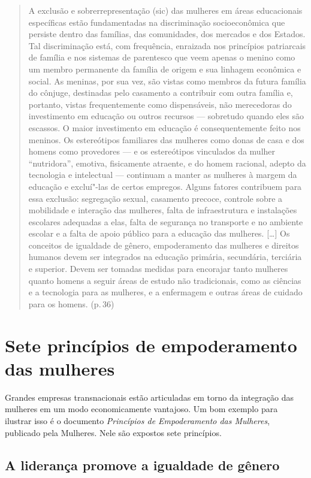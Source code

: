 \begin{quote}
A exclusão e sobrerrepresentação (sic) das mulheres em áreas
educacionais específicas estão fundamentadas na discriminação
socioeconômica que persiste dentro das famílias, das comunidades, dos
mercados e dos Estados. Tal discriminação está, com frequência,
enraizada nos princípios patriarcais de família e nos sistemas de
parentesco que veem apenas o menino como um membro permanente da família
de origem e sua linhagem econômica e social. As meninas, por sua vez,
são vistas como membros da futura família do cônjuge, destinadas pelo
casamento a contribuir com outra família e, portanto, vistas
frequentemente como dispensáveis, não merecedoras do investimento em
educação ou outros recursos --- sobretudo quando eles são escassos. O
maior investimento em educação é consequentemente feito nos meninos. Os
estereótipos familiares das mulheres como donas de casa e dos homens
como provedores --- e os estereótipos vinculados da mulher ``nutridora'',
emotiva, fisicamente atraente, e do homem racional, adepto da tecnologia
e intelectual --- continuam a manter as mulheres à margem da educação e
excluí"-las de certos empregos. Alguns fatores contribuem para essa
exclusão: segregação sexual, casamento precoce, controle sobre a
mobilidade e interação das mulheres, falta de infraestrutura e
instalações escolares adequadas a elas, falta de segurança no transporte
e no ambiente escolar e a falta de apoio público para a educação das
mulheres. {[}\ldots{}{]} Os conceitos de igualdade de gênero, empoderamento
das mulheres e direitos humanos devem ser integrados na educação
primária, secundária, terciária e superior. Devem ser tomadas medidas
para encorajar tanto mulheres quanto homens a seguir áreas de estudo não
tradicionais, como as ciências e a tecnologia para as mulheres, e a
enfermagem e outras áreas de cuidado para os homens. (p.\,36)
\end{quote}

\chapter{Sete princípios de empoderamento das mulheres}

Grandes empresas transnacionais estão articuladas em torno da integração
das mulheres em um modo economicamente vantajoso. Um bom exemplo para
ilustrar isso é o documento \emph{Princípios de Empoderamento das
Mulheres}, publicado pela  Mulheres. Nele são expostos sete
princípios.

\section{A liderança promove a igualdade de gênero}

